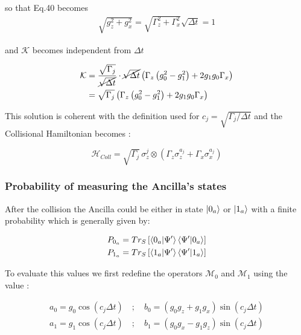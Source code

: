 \documentclass[a4paper,12pt]{article}
\begin{document}
	   so that Eq.40 becomes
	   \begin{align}
	   	\sqrt{g_{z}^{2} + g_{x}^{2}} = \sqrt{\Gamma_{z}^{2} + \Gamma_{x}^{2} } \sqrt{\Delta t} = 1
	   \end{align}
	   
	   and $ \mathcal{K} $ becomes independent from $ \Delta t $
	   
	   \begin{align}
		\mathcal{K} &= \frac{\sqrt{\Gamma_{j}}}{\cancel{\sqrt{\Delta t}}} \cdot \cancel{\sqrt{\Delta t}} \left( \Gamma_{z}\left(g_{0}^{2} - g_{1}^{2} \right) + 2 g_{1} g_{0} \Gamma_{x}\right) \notag \\
		&= \sqrt{\Gamma_{j}} \left( \Gamma_{z}\left(g_{0}^{2} - g_{1}^{2} \right) + 2 g_{1} g_{0} \Gamma_{x}\right)
	   \end{align}
	   
	   This solution is coherent with the definition used for $ c_j = \sqrt{\Gamma_j / \Delta t} $ and the Collisional Hamiltonian becomes :
	    
	   \begin{equation}
	   	\mathcal{H}_{Coll} = \sqrt{\Gamma_{j}} \, \sigma_{z}^{j} \otimes \left( \Gamma_{z} \sigma_{z}^{a_j} + \Gamma_{x} \sigma_{x}^{a_j} \right)
	   \end{equation}
	   	   
	   \subsubsection{Probability of measuring the Ancilla's states}
	   
	   After the collision the Ancilla could be either in state $ \ket{0_a} $ or $ \ket{1_a} $ with a finite probability which is generally given by:
	   
	   \begin{align}
	   	P_{0_{a}} = Tr_{S} \left[\braket{0_a|\Psi'}\braket{\Psi'|0_a} \right] \\
	   	P_{1_{a}} = Tr_{S} \left[\braket{1_a|\Psi'}\braket{\Psi'|1_a} \right]
	   \end{align}
	   
	   \newpage
	   
	   To evaluate this values we first redefine the operators $ \mathcal{M}_{0} $ and $ \mathcal{M}_{1} $ using the value :
	   
	   \begin{align}
	   	a_{0} = g_{0} \cos{\left(c_{j}\Delta t\right)} \quad ; \quad b_{0} = \left(g_{0} g_{z} + g_{1}g_{x} \right) \sin{\left(c_{j}\Delta t\right)} \\
	   	a_{1} = g_{1} \cos{\left(c_{j}\Delta t\right)} \quad ; \quad b_{1} = \left(g_{0} g_{x} - g_{1}g_{z} \right) \sin{\left(c_{j}\Delta t\right)}
	   \end{align}
	   
\end{document}

